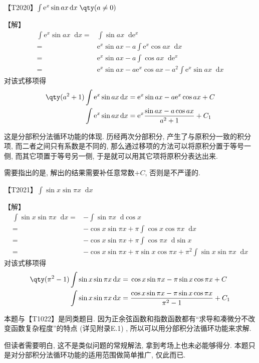 \documentclass{ctexbook}
\newcommand{\e}{\mathrm{e}}
\newcommand*{\dif}{\mathop{}\!\mathrm{d}}
\begin{document}
{{\color{red}【T2020】}$\int\e^{x}\sin{ax}\dif{x}\;\qty(a\ne0)$\par
【解】
\begin{align*}
\int\e^{x}\sin{ax}\dif{x}={}&\int\sin{ax}\dif{\e^{x}}\\
={}&\e^{x}\sin{ax}-a\int\e^{x}\cos{ax}\dif{x}\\
={}&\e^{x}\sin{ax}-a\int\cos{ax}\dif{\e^{x}}\\
={}&\e^{x}\sin{ax}-a\e^{x}\cos{ax}-a^{2}\int\e^{x}\sin{ax}\dif{x}
\end{align*}
对该式移项得
\begin{align*}
\qty(a^{2}+1)\int\e^{x}\sin{ax}\dif{x}={}&\e^{x}\sin{ax}-a\e^{x}\cos{ax}+C\\
\int\e^{x}\sin{ax}\dif{x}={}&\e^{x}\frac{\sin{ax}-a\cos{ax}}{a^{2}+1}+C_{1}
\end{align*}\par
{\kaishu 这是分部积分法循环功能的体现. 历经两次分部积分, 产生了与原积分一致的积分项, 而二者之间只有系数是不同的, 那么通过移项的方法可以将原积分置于等号一侧, 而其它项置于等号另一侧, 于是就可以用其它项将原积分表达出来. \par
需要指出的是, 解出的结果需要补任意常数$+C$, 否则是不严谨的. \par}
{\color{red}【T2021】}$\int\sin{x}\sin{\pi x}\dif{x}$\par
【解】
\begin{align*}
\int\sin{x}\sin{\pi x}\dif{x}={}&-\int\sin{\pi x}\dif{\cos{x}}\\
={}&-\cos{x}\sin{\pi x}+\pi\int\cos{x}\cos{\pi x}\dif{x}\\
={}&-\cos{x}\sin{\pi x}+\pi\int\cos{\pi x}\dif{\sin{x}}\\
={}&-\cos{x}\sin{\pi x}+\pi\sin{x}\cos{\pi x}+\pi^{2}\int\sin{x}\sin{\pi x}\dif{x}
\end{align*}
对该式移项得
\begin{align*}
\qty(\pi^{2}-1)\int\sin{x}\sin{\pi x}\dif{x}={}&\cos{x}\sin{\pi x}-\pi\sin{x}\cos{\pi x}+C\\
\int\sin{x}\sin{\pi x}\dif{x}={}&\frac{\cos{x}\sin{\pi x}-\pi\sin{x}\cos{\pi x}}{\pi^{2}-1}+C_{1}
\end{align*}\par
{\kaishu 本题与{\color{red}【T1022】}是同类题目. 因为正余弦函数和指数函数都有“求导和凑微分不改变函数复杂程度”的特点 (详见附录E.1) , 所以可以用分部积分法循环功能来求解. \par
但读者需要明白, 这不是类似问题的常规解法, 拿到考场上也未必能够得分. 本题只是对分部积分法循环功能的适用范围做简单推广, 仅此而已. \par}
}
\end{document}
